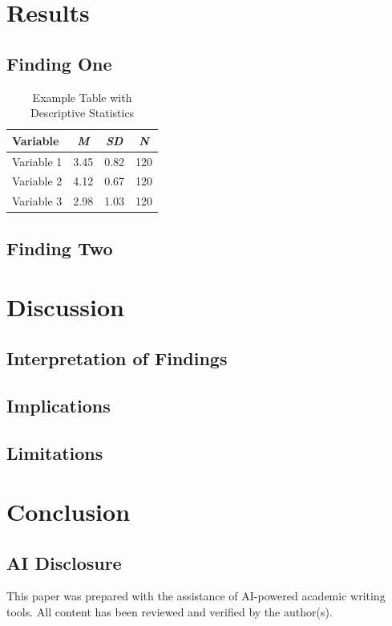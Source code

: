 \documentclass[12pt, a4paper]{article}
\begin{document}
\section{Results}

\subsection{Finding One}

\begin{table}[H]
\centering
\caption{Example Table with Descriptive Statistics}
\label{tab:example}
\begin{tabular}{lccc}
\toprule
\textbf{Variable} & \textbf{\textit{M}} & \textbf{\textit{SD}} & \textbf{\textit{N}} \\
\midrule
Variable 1 & 3.45 & 0.82 & 120 \\
Variable 2 & 4.12 & 0.67 & 120 \\
Variable 3 & 2.98 & 1.03 & 120 \\
\bottomrule
\end{tabular}
\end{table}

\subsection{Finding Two}

\section{Discussion}

\subsection{Interpretation of Findings}

\subsection{Implications}

\subsection{Limitations}

\section{Conclusion}

\subsection*{AI Disclosure}
This paper was prepared with the assistance of AI-powered academic writing tools. All content has been reviewed and verified by the author(s).

\newpage


\end{document}
